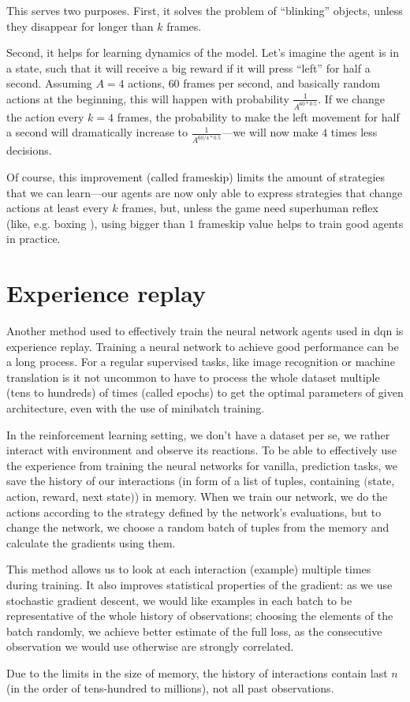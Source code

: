 This serves two purposes. First, it solves the problem of ``blinking'' objects, unless they disappear for longer than $k$ frames.

Second, it helps for learning dynamics of the model. Let's imagine the agent is in a state, such that it will receive a big reward if it will press ``left'' for half a second. Assuming $A=4$ actions, $60$ frames per second, and basically random actions at the beginning, this will happen with probability $\frac{1}{A^{60 * 0.5}}$. If we change the action every $k=4$ frames, the probability to make the left movement for half a second will dramatically increase to $\frac{1}{A^{60/4 * 0.5}}$---we will now make $4$ times less decisions.

Of course, this improvement (called frameskip) limits the amount of strategies that we can learn---our agents are now only able to express strategies that change actions at least every $k$ frames, but, unless the game need superhuman reflex (like, e.g. boxing ), using bigger than $1$ frameskip value helps to train good agents in practice.

\section{Experience replay}
Another method used to effectively train the neural network agents used in dqn is experience replay. Training a neural network to achieve good performance can be a long process. For a regular supervised tasks, like image recognition or machine translation is it not uncommon to have to process the whole dataset multiple (tens to hundreds) of times (called epochs) to get the optimal parameters of given architecture, even with the use of minibatch training.

In the reinforcement learning setting, we don't have a dataset per se, we rather interact with environment and observe its reactions. To be able to effectively use the experience from training the neural networks for vanilla, prediction tasks, we save the history of our interactions (in form of a list of tuples, containing $($state, action, reward, next state$)$) in memory. When we train our network, we do the actions according to the strategy defined by the network's evaluations, but to change the network, we choose a random batch of tuples from the memory and calculate the gradients using them.

This method allows us to look at each interaction (example) multiple times during training. It also improves statistical properties of the gradient: as we use stochastic gradient descent, we would like examples in each batch to be representative of the whole history of observations; choosing the elements of the batch randomly, we achieve better estimate of the full loss, as the consecutive observation we would use otherwise are strongly correlated.

Due to the limits in the size of memory, the history of interactions contain last $n$ (in the order of tens-hundred to millions), not all past observations.
